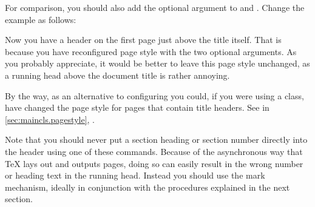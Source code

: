 \begin{Example}
  For comparison, you should also add the optional argument to
   and . Change the example as follows:
  Now you have a header on the first page just above the title itself.
  That is because you have reconfigured page style
   with the two optional
  arguments. As you probably appreciate, it would be better to leave this page
  style unchanged, as a running head above the document title is rather
  annoying.
  
  By the way, as an alternative to configuring
   you could, if you were
  using a \KOMAScript{} class, have changed the page style for pages that
  contain title headers. See %
   in \autoref{sec:maincls.pagestyle},
  .
\end{Example}

Note that you should never put a section
heading or section number directly into the header using one of these
commands. Because of the asynchronous way that \TeX{} lays out and outputs
pages, doing so can easily result in the wrong number or heading text in the
running head. Instead you should use the mark mechanism, ideally in
conjunction with the procedures explained in the next section.%
\EndIndexGroup

